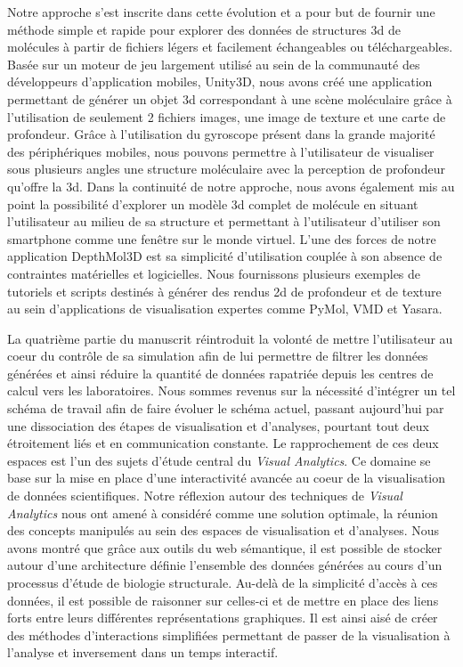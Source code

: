 Notre approche s'est inscrite dans cette évolution et a pour but de fournir une méthode simple et rapide pour explorer des données de structures 3d de molécules à partir de fichiers légers et facilement échangeables ou téléchargeables. Basée sur un moteur de jeu largement utilisé au sein de la communauté des développeurs d'application mobiles, Unity3D, nous avons créé une application permettant de générer un objet 3d correspondant à une scène moléculaire grâce à l'utilisation de seulement 2 fichiers images, une image de texture et une carte de profondeur. Grâce à l'utilisation du gyroscope présent dans la grande majorité des périphériques mobiles, nous pouvons permettre à l'utilisateur de visualiser sous plusieurs angles une structure moléculaire avec la perception de profondeur qu'offre la 3d.
Dans la continuité de notre approche, nous avons également mis au point la possibilité d'explorer un modèle 3d complet de molécule en situant l'utilisateur au milieu de sa structure et permettant à l'utilisateur d'utiliser son smartphone comme une fenêtre sur le monde virtuel.
L'une des forces de notre application DepthMol3D est sa simplicité d'utilisation couplée à son absence de contraintes matérielles et logicielles. Nous fournissons plusieurs exemples de tutoriels et scripts destinés à générer des rendus 2d de profondeur et de texture au sein d'applications de visualisation expertes comme PyMol, VMD et Yasara.


La quatrième partie du manuscrit réintroduit la volonté de mettre l'utilisateur au coeur du contrôle de sa simulation afin de lui permettre de filtrer les données générées et ainsi réduire la quantité de données rapatriée depuis les centres de calcul vers les laboratoires. Nous sommes revenus sur la nécessité d'intégrer un tel schéma de travail afin de faire évoluer le schéma actuel, passant aujourd'hui par une dissociation des étapes de visualisation et d'analyses, pourtant tout deux étroitement liés et en communication constante.
Le rapprochement de ces deux espaces est l'un des sujets d'étude central du \textit{Visual Analytics}. Ce domaine se base sur la mise en place d'une interactivité avancée au coeur de la visualisation de données scientifiques. Notre réflexion autour des techniques de \textit{Visual Analytics} nous ont amené à considéré comme une solution optimale, la réunion des concepts manipulés au sein des espaces de visualisation et d'analyses.
Nous avons montré que grâce aux outils du web sémantique, il est possible de stocker autour d'une architecture définie l'ensemble des données générées au cours d'un processus d'étude de biologie structurale. Au-delà de la simplicité d'accès à ces données, il est possible de raisonner sur celles-ci et de mettre en place des liens forts entre leurs différentes représentations graphiques. Il est ainsi aisé de créer des méthodes d'interactions simplifiées permettant de passer de la visualisation à l'analyse et inversement dans un temps interactif.

